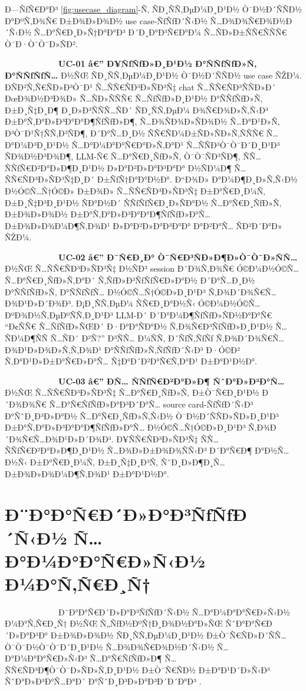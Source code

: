 \documentclass[12pt,A4]{report}
\begin{document}
Ð—ÑƒÑ€Ð°Ð³ \ref{fig:usecase_diagram}-Ñ‚ ÑÐ¸ÑÑ‚ÐµÐ¼Ð¸Ð¹Ð½ Ò¯Ð½Ð´ÑÑÐ½
Ð°ÐºÑ‚Ð¾Ñ€ Ð±Ð¾Ð»Ð¾Ð½ use case-ÑƒÑƒÐ´Ñ‹Ð½ Ñ…Ð¾Ð¾Ñ€Ð¾Ð½Ð´Ñ‹Ð½ Ñ…Ð°Ñ€Ð¸Ð»Ñ†Ð°Ð°Ð³
Ð´Ð¸Ð°Ð³Ñ€Ð°Ð¼ Ñ…ÑÐ»Ð±ÑÑ€ÑÑÑ€ Ò¯Ð·Ò¯Ò¯Ð»ÑÐ².

\ \ \ \ \ \ \ \ \  \ \ \ \ \textbf{UC-01 â€” Ð¥ÑƒÑƒÐ»Ð¸Ð¹Ð½ Ð°ÑÑƒÑƒÐ»Ñ‚ Ð°ÑÑƒÑƒÑ…}
Ð½ÑŒ ÑÐ¸ÑÑ‚ÐµÐ¼Ð¸Ð¹Ð½ Ò¯Ð½Ð´ÑÑÐ½ use case ÑŽÐ¼. ÐÑÐ²Ñ‚Ñ€ÑÐ»Ð³Ò¯Ð¹ Ñ…ÑÑ€ÑÐ³Ð»ÑÐ³Ñ‡ chat
Ñ…ÑÑ€ÑÐ³ÑÑÐ»Ð´ ÐœÐ¾Ð½Ð³Ð¾Ð» Ñ…ÑÐ»ÑÑÑ€ Ñ…ÑƒÑƒÐ»Ð¸Ð¹Ð½ Ð°ÑÑƒÑƒÐ»Ñ‚ Ð±Ð¸Ñ‡Ð¸Ð¶ Ð¸Ð»Ð³ÑÑÑ…ÑÐ´
ÑÐ¸ÑÑ‚ÐµÐ¼ Ð¾Ñ€Ð¾Ð»Ñ‚Ñ‹Ð³ Ð±Ð°Ñ‚Ð°Ð»Ð³Ð°Ð°Ð¶ÑƒÑƒÐ»Ð¶, Ñ…Ð¾ÑÐ¾Ð»ÑÐ¾Ð½ Ñ…Ð°Ð¹Ð»Ñ‚ Ð³Ò¯Ð¹Ñ†ÑÑ‚Ð³ÑÐ¶,
Ð´Ð°Ñ…Ð¸Ð½ ÑÑ€ÑÐ¼Ð±ÑÐ»ÑÐ»Ñ‚ÑÑÑ€ Ñ…Ð°Ð¼Ð³Ð¸Ð¹Ð½ Ñ…Ð°Ð¼Ð°Ð°Ñ€Ð°Ð»Ñ‚Ð°Ð¹ Ñ…ÑÑÐ³Ò¯Ò¯Ð´Ð¸Ð¹Ð³ ÑÐ¾Ð½Ð³Ð¾Ð¶,
LLM-Ñ€ Ñ…Ð°Ñ€Ð¸ÑƒÐ»Ñ‚ Ò¯Ò¯ÑÐ³ÑÐ¶, ÑÑ… ÑÑƒÑ€Ð²Ð°Ð»Ð¶Ð¸Ð¹Ð½ Ð»Ð°Ð²Ð»Ð°Ð³Ð°Ð° Ð½ÑÐ¼Ð¶
Ñ…ÑÑ€ÑÐ³Ð»ÑÐ³Ñ‡Ð¸Ð´ Ð±ÑƒÑ†Ð°Ð°Ð½Ð°. Ð“Ð¾Ð» Ð°Ð¼Ð¶Ð¸Ð»Ñ‚Ñ‹Ð½ Ð½Ó©Ñ…Ñ†Ó©Ð» Ð±Ð¾Ð» Ñ…ÑÑ€ÑÐ³Ð»ÑÐ³Ñ‡
Ð±Ð°Ñ€Ð¸Ð¼Ñ‚ Ð±Ð¸Ñ‡Ð³Ð¸Ð¹Ð½ ÑÐ°Ð½Ð´ ÑÑƒÑƒÑ€Ð¸Ð»ÑÐ°Ð½ Ñ…Ð°Ñ€Ð¸ÑƒÐ»Ñ‚ Ð±Ð¾Ð»Ð¾Ð½ Ð±Ð°Ñ‚Ð°Ð»Ð³Ð°Ð°Ð¶ÑƒÑƒÐ»Ð°Ñ…
Ð±Ð¾Ð»Ð¾Ð¼Ð¶Ñ‚Ð¾Ð¹ Ð»Ð°Ð²Ð»Ð°Ð³Ð°Ð° Ð°Ð²Ð°Ñ… ÑÐ²Ð´Ð°Ð» ÑŽÐ¼.

\ \ \ \ \ \ \ \ \  \ \ \ \ \textbf{UC-02 â€” Ð¯Ñ€Ð¸Ð° Ò¯Ñ€Ð³ÑÐ»Ð¶Ð»Ò¯Ò¯Ð»ÑÑ…}
Ð½ÑŒ Ñ…ÑÑ€ÑÐ³Ð»ÑÐ³Ñ‡ Ð½ÑÐ³ session Ð´Ð¾Ñ‚Ð¾Ñ€ Ó©Ð¼Ð½Ó©Ñ… Ñ…Ð°Ñ€Ð¸ÑƒÐ»Ñ‚Ð°Ð´ Ñ‚ÑƒÐ»Ð³ÑƒÑƒÑ€Ð»Ð°Ð½
Ð´Ð°Ñ…Ð¸Ð½ Ð°ÑÑƒÑƒÐ»Ñ‚ Ð°ÑÑƒÑƒÑ… Ð½Ó©Ñ…Ñ†Ó©Ð»Ð¸Ð¹Ð³ Ñ‚Ð¾Ð´Ð¾Ñ€Ñ…Ð¾Ð¹Ð»Ð´Ð¾Ð³. Ð¡Ð¸ÑÑ‚ÐµÐ¼ ÑÑ€Ð¸Ð°Ð½Ñ‹
Ó©Ð¼Ð½Ó©Ñ… ÐºÐ¾Ð½Ñ‚ÐµÐºÑÑ‚Ð¸Ð¹Ð³ LLM-Ð´ Ð´Ð°Ð¼Ð¶ÑƒÑƒÐ»ÑÐ½Ð°Ð°Ñ€ ``Ð¢ÑÑ€ Ñ…ÑƒÑƒÐ»ÑŒÐ´ Ð·Ð°Ð°ÑÐ°Ð½
Ñ‚Ð¾Ñ€Ð³ÑƒÑƒÐ»Ð¸Ð¹Ð½ Ñ…ÑÐ¼Ð¶ÑÑ Ñ…ÑÐ´ Ð²Ñ?'' Ð³ÑÑ… Ð¼ÑÑ‚ Ð´ÑƒÑ‚ÑƒÑƒ Ñ‚Ð¾Ð´Ð¾Ñ€Ñ…Ð¾Ð¹Ð»Ð¾Ð»Ñ‚Ñ‚Ð¾Ð¹
Ð°ÑÑƒÑƒÐ»Ñ‚ÑƒÑƒÐ´Ñ‹Ð³ Ð·Ó©Ð² Ñ‚Ð°Ð¹Ð»Ð±Ð°Ñ€Ð»Ð°Ñ… Ñ‡Ð°Ð´Ð²Ð°Ñ€Ñ‚Ð°Ð¹ Ð±Ð°Ð¹Ð½Ð°.

\ \ \ \ \ \ \ \ \  \ \ \ \ \textbf{UC-03 â€” Ð­Ñ… ÑÑƒÑ€Ð²Ð°Ð»Ð¶ ÑˆÐ°Ð»Ð³Ð°Ñ…}
Ð½ÑŒ Ñ…ÑÑ€ÑÐ³Ð»ÑÐ³Ñ‡ Ñ…Ð°Ñ€Ð¸ÑƒÐ»Ñ‚ Ð±Ò¯Ñ€Ð¸Ð¹Ð½ Ð´Ð¾Ð¾Ñ€ Ñ…Ð°Ñ€ÑƒÑƒÐ»Ð°Ð³Ð´Ð°Ñ… source
card-ÑƒÑƒÐ´Ñ‹Ð³ Ð°ÑˆÐ¸Ð³Ð»Ð°Ð½ Ñ…Ð°Ñ€Ð¸ÑƒÐ»Ñ‚Ñ‹Ð½ Ò¯Ð½Ð´ÑÑÐ»ÑÐ»Ð¸Ð¹Ð³ Ð±Ð°Ñ‚Ð°Ð»Ð³Ð°Ð°Ð¶ÑƒÑƒÐ»Ð°Ñ…
Ð½Ó©Ñ…Ñ†Ó©Ð»Ð¸Ð¹Ð³ Ñ‚Ð¾Ð´Ð¾Ñ€Ñ…Ð¾Ð¹Ð»Ð´Ð¾Ð³. Ð¥ÑÑ€ÑÐ³Ð»ÑÐ³Ñ‡ ÑÑ… ÑÑƒÑ€Ð²Ð°Ð»Ð¶Ð¸Ð¹Ð½ Ñ…Ð¾Ð»Ð±Ð¾Ð¾ÑÑ‹Ð³
Ð´Ð°Ñ€Ð¶ Ð°Ð½Ñ…Ð½Ñ‹ Ð±Ð°Ñ€Ð¸Ð¼Ñ‚ Ð±Ð¸Ñ‡Ð¸Ð³Ñ‚ ÑˆÐ¸Ð»Ð¶Ð¸Ñ… Ð±Ð¾Ð»Ð¾Ð¼Ð¶Ñ‚Ð¾Ð¹ Ð±Ð°Ð¹Ð½Ð°.

\section{Ð¨Ð°Ð°Ñ€Ð´Ð»Ð°Ð³ÑƒÑƒÐ´Ñ‹Ð½ Ñ…Ð°Ð¼Ð°Ð°Ñ€Ð»Ñ‹Ð½ Ð¼Ð°Ñ‚Ñ€Ð¸Ñ†}

\ \ \ \ \ \ \ \ \  \ \ \ \ Ð¨Ð°Ð°Ñ€Ð´Ð»Ð°Ð³ÑƒÑƒÐ´Ñ‹Ð½ Ñ…Ð°Ð¼Ð°Ð°Ñ€Ð»Ñ‹Ð½ Ð¼Ð°Ñ‚Ñ€Ð¸Ñ† Ð½ÑŒ
Ñ„ÑƒÐ½ÐºÑ†Ð¸Ð¾Ð½Ð°Ð»ÑŒ ÑˆÐ°Ð°Ñ€Ð´Ð»Ð°Ð³Ð° Ð±Ð¾Ð»Ð¾Ð½ ÑÐ¸ÑÑ‚ÐµÐ¼Ð¸Ð¹Ð½ Ð±Ò¯Ñ€ÑÐ»Ð´ÑÑ…Ò¯Ò¯Ð½Ò¯Ò¯Ð´Ð¸Ð¹Ð½
Ñ…Ð¾Ð¾Ñ€Ð¾Ð½Ð´Ñ‹Ð½ Ñ…Ð°Ð¼Ð°Ð°Ñ€Ð»Ñ‹Ð³ Ñ…Ð°Ñ€ÑƒÑƒÐ»Ð¶ Ñ…ÑÑ€ÑÐ³Ð¶Ò¯Ò¯Ð»ÑÐ»Ñ‚Ð¸Ð¹Ð½ Ð±Ò¯Ñ€ÑÐ½
Ð±Ð°Ð¹Ð´Ð»Ñ‹Ð³ ÑˆÐ°Ð»Ð³Ð°Ñ…Ð°Ð´ Ð°ÑˆÐ¸Ð³Ð»Ð°Ð³Ð´Ð´Ð°Ð³ \cite{hull2011requirements}.
\end{document}
